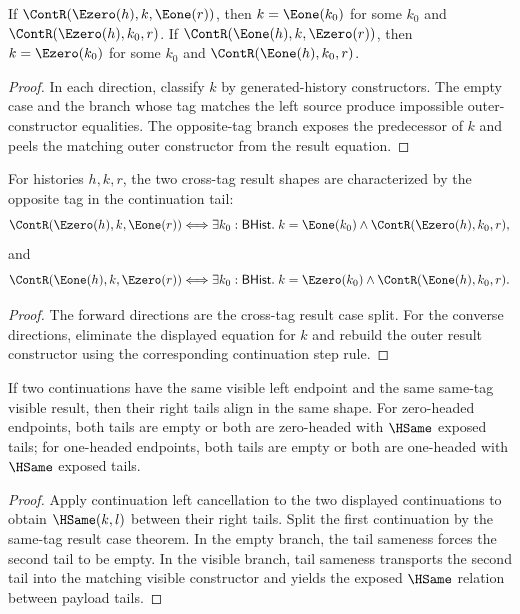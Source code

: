 \begin{theorem}
\label{thm:cont-left-tag-cross-result-cases}
If $\ContR(\Ezero(h),k,\Eone(r))$, then $k=\Eone(k_0)$ for some $k_0$
and $\ContR(\Ezero(h),k_0,r)$. If $\ContR(\Eone(h),k,\Ezero(r))$, then
$k=\Ezero(k_0)$ for some $k_0$ and $\ContR(\Eone(h),k_0,r)$.
\end{theorem}
\begin{proof}
In each direction, classify $k$ by generated-history constructors. The empty
case and the branch whose tag matches the left source produce impossible
outer-constructor equalities. The opposite-tag branch exposes the predecessor
of $k$ and peels the matching outer constructor from the result equation.
\end{proof}

\begin{theorem}
\label{thm:cont-left-tag-cross-result-iff-pair}
For histories \(h,k,r\), the two cross-tag result shapes are characterized by
the opposite tag in the continuation tail:
$$
\ContR(\Ezero(h),k,\Eone(r))
\Longleftrightarrow
\exists k_0:\mathsf{BHist}.\;k=\Eone(k_0)\land\ContR(\Ezero(h),k_0,r),
$$
and
$$
\ContR(\Eone(h),k,\Ezero(r))
\Longleftrightarrow
\exists k_0:\mathsf{BHist}.\;k=\Ezero(k_0)\land\ContR(\Eone(h),k_0,r).
$$
\end{theorem}
\begin{proof}
The forward directions are the cross-tag result case split. For the converse
directions, eliminate the displayed equation for \(k\) and rebuild the outer
result constructor using the corresponding continuation step rule.
\end{proof}

\begin{theorem}
\label{thm:cont-left-same-tag-tail-alignment}
If two continuations have the same visible left endpoint and the same
same-tag visible result, then their right tails align in the same shape. For
zero-headed endpoints, both tails are empty or both are zero-headed with
$\HSame$ exposed tails; for one-headed endpoints, both tails are empty or both
are one-headed with $\HSame$ exposed tails.
\end{theorem}
\begin{proof}
Apply continuation left cancellation to the two displayed continuations to
obtain $\HSame(k,l)$ between their right tails. Split the first continuation by
the same-tag result case theorem. In the empty branch, the tail sameness forces
the second tail to be empty. In the visible branch, tail sameness transports
the second tail into the matching visible constructor and yields the exposed
$\HSame$ relation between payload tails.
\end{proof}

